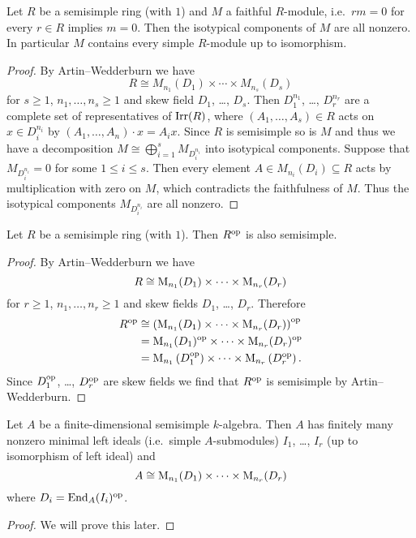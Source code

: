 \begin{cor}
  Let $R$ be a semisimple ring (with $1$) and $M$ a faithful $R$-module, i.e.\ $rm = 0$ for every $r \in R$ implies $m = 0$. Then the isotypical components of $M$ are all nonzero. In particular $M$ contains every simple $R$-module up to isomorphism.
\end{cor}
\begin{proof}
  By Artin--Wedderburn we have
  \[
    R \cong M_{n_1}(D_1) \times \dotsb \times M_{n_s}(D_s)
  \]
  for $s \geq 1$, $n_1, \dotsc, n_s \geq 1$ and skew field $D_1$, \dots, $D_s$. Then $D_1^{n_1}$, \dots, $D_r^{n_r}$ are a complete set of representatives of $\operatorname{Irr}(R)$, where $(A_1, \dotsc, A_s) \in R$ acts on $x \in D_i^{n_i}$ by $(A_1, \dotsc, A_n) \cdot x = A_i x$. Since $R$ is semisimple so is $M$ and thus we have a decomposition $M \cong \bigoplus_{i=1}^s M_{D_i^{n_i}}$ into isotypical components. Suppose that $M_{D_i^{n_i}} = 0$ for some $1 \leq i \leq s$. Then every element $A \in M_{n_i}(D_i) \subseteq R$ acts by multiplication with zero on $M$, which contradicts the faithfulness of $M$. Thus the isotypical components $M_{D_i^{n_i}}$ are all nonzero.
\end{proof}




\begin{cor}
  Let $R$ be a semisimple ring (with $1$). Then $R^{\mathrm{op}}$ is also semisimple.
\end{cor}
\begin{proof}
  By Artin--Wedderburn we have
  \[
    R \cong \operatorname{M}_{n_1}(D_1) \times \dotsm \times \operatorname{M}_{n_r}(D_r)
  \]
  for $r \geq 1$, $n_1, \dotsc, n_r \geq 1$ and skew fields $D_1$, \dots, $D_r$. Therefore
  \begin{align*}
    R^{\mathrm{op}}
    &\cong \left( \operatorname{M}_{n_1}(D_1) \times \dotsm \times \operatorname{M}_{n_r}(D_r) \right)^{\mathrm{op}} \\
    &= \operatorname{M}_{n_1}(D_1)^{\mathrm{op}} \times \dotsm \times \operatorname{M}_{n_r}(D_r)^{\mathrm{op}} \\
    &= \operatorname{M}_{n_1}\left(D_1^{\mathrm{op}}\right) \times \dotsm \times \operatorname{M}_{n_r}\left(D_r^{\mathrm{op}}\right).
  \end{align*}
  Since $D_1^{\mathrm{op}}$, \dots, $D_r^{\mathrm{op}}$ are skew fields we find that $R^{\mathrm{op}}$ is semisimple by Artin--Wedderburn.
\end{proof}


\begin{cor}
  Let $A$ be a finite-dimensional semisimple $k$-algebra. Then $A$ has finitely many nonzero minimal left ideals (i.e.\ simple $A$-submodules) $I_1$, \dots, $I_r$ (up to isomorphism of left ideal) and
  \[
    A \cong \operatorname{M}_{n_1}(D_1) \times \dotsm \times \operatorname{M}_{n_r}(D_r)
  \]
  where $D_i = \operatorname{End}_A(I_i)^{\mathrm{op}}$.
\end{cor}
\begin{proof}
  We will prove this later.
\end{proof}


